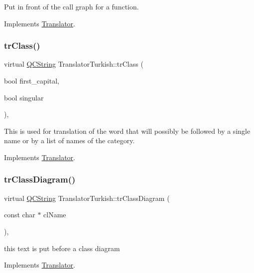 Put in front of the call graph for a function. 

Implements \mbox{\hyperlink{class_translator}{Translator}}.

\mbox{\label{class_translator_turkish_a56812ac360c635ae377de6b9294cb65c}} 
\subsubsection{\texorpdfstring{trClass()}{trClass()}}
{\footnotesize\ttfamily virtual \mbox{\hyperlink{class_q_c_string}{Q\+C\+String}} Translator\+Turkish\+::tr\+Class (\begin{DoxyParamCaption}\item[{bool}]{first\+\_\+capital,  }\item[{bool}]{singular }\end{DoxyParamCaption})\hspace{0.3cm}{\ttfamily [inline]}, {\ttfamily [virtual]}}

This is used for translation of the word that will possibly be followed by a single name or by a list of names of the category. 

Implements \mbox{\hyperlink{class_translator}{Translator}}.

\mbox{\label{class_translator_turkish_a240274da7d6b596e4c18cddb37c0f1bb}} 
\subsubsection{\texorpdfstring{trClassDiagram()}{trClassDiagram()}}
{\footnotesize\ttfamily virtual \mbox{\hyperlink{class_q_c_string}{Q\+C\+String}} Translator\+Turkish\+::tr\+Class\+Diagram (\begin{DoxyParamCaption}\item[{const char $\ast$}]{cl\+Name }\end{DoxyParamCaption})\hspace{0.3cm}{\ttfamily [inline]}, {\ttfamily [virtual]}}

this text is put before a class diagram 

Implements \mbox{\hyperlink{class_translator}{Translator}}.

